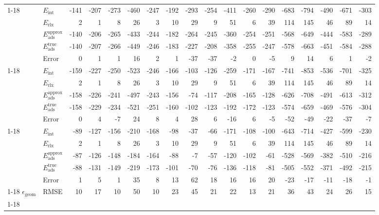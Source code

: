 \begin{longtable}{llrrrrrrrrrrrrrrrr}
\cline{1-18}
\multirow[]{5}{*}{\rotatebox{90}{rev-vdW-DF2}} & $E_\textrm{int}$ & -141 & -207 & -273 & -460 & -247 & -192 & -293 & -254 & -411 & -260 & -290 & -683 & -794 & -490 & -671 & -303 \\
 & $E_\textrm{rlx}$ & 2 & 1 & 8 & 26 & 3 & 10 & 29 & 9 & 51 & 6 & 39 & 114 & 145 & 46 & 89 & 14 \\
 & $E_\textrm{ads}^\textrm{approx}$ & -140 & -206 & -265 & -433 & -244 & -182 & -264 & -245 & -360 & -254 & -251 & -568 & -649 & -444 & -583 & -289 \\
 & $E_\textrm{ads}^\textrm{true}$ & -140 & -207 & -266 & -449 & -246 & -183 & -227 & -208 & -358 & -255 & -247 & -578 & -663 & -451 & -584 & -288 \\
 & Error & 0 & 1 & 1 & 16 & 2 & 1 & -37 & -37 & -2 & 0 & -5 & 9 & 14 & 6 & 1 & -2 \\
\cline{1-18}
\multirow[]{5}{*}{\rotatebox{90}{PBE0-D4}} & $E_\textrm{int}$ & -159 & -227 & -250 & -523 & -246 & -166 & -103 & -126 & -259 & -171 & -167 & -741 & -853 & -536 & -701 & -325 \\
 & $E_\textrm{rlx}$ & 2 & 1 & 8 & 26 & 3 & 10 & 29 & 9 & 51 & 6 & 39 & 114 & 145 & 46 & 89 & 14 \\
 & $E_\textrm{ads}^\textrm{approx}$ & -158 & -226 & -241 & -497 & -243 & -156 & -74 & -117 & -208 & -165 & -128 & -626 & -708 & -491 & -613 & -312 \\
 & $E_\textrm{ads}^\textrm{true}$ & -158 & -229 & -234 & -521 & -251 & -160 & -102 & -123 & -192 & -172 & -123 & -574 & -659 & -469 & -576 & -304 \\
 & Error & 0 & 4 & -7 & 24 & 8 & 4 & 28 & 6 & -16 & 6 & -5 & -52 & -49 & -22 & -37 & -7 \\
\cline{1-18}
\multirow[]{5}{*}{\rotatebox{90}{B3LYP-D2[Ne]}} & $E_\textrm{int}$ & -89 & -127 & -156 & -210 & -168 & -98 & -37 & -66 & -171 & -108 & -100 & -643 & -714 & -427 & -599 & -230 \\
 & $E_\textrm{rlx}$ & 2 & 1 & 8 & 26 & 3 & 10 & 29 & 9 & 51 & 6 & 39 & 114 & 145 & 46 & 89 & 14 \\
 & $E_\textrm{ads}^\textrm{approx}$ & -87 & -126 & -148 & -184 & -164 & -88 & -7 & -57 & -120 & -102 & -61 & -528 & -569 & -382 & -510 & -216 \\
 & $E_\textrm{ads}^\textrm{true}$ & -88 & -131 & -149 & -219 & -173 & -101 & -70 & -76 & -136 & -118 & -81 & -505 & -552 & -371 & -492 & -215 \\
 & Error & 1 & 5 & 1 & 35 & 8 & 13 & 62 & 18 & 16 & 16 & 20 & -23 & -17 & -11 & -18 & -1 \\
\cline{1-18}
$\epsilon_\textrm{geom}$ & RMSE & 10 & 17 & 10 & 50 & 10 & 23 & 45 & 21 & 22 & 13 & 21 & 36 & 43 & 24 & 26 & 15 \\
\cline{1-18}
\end{longtable}